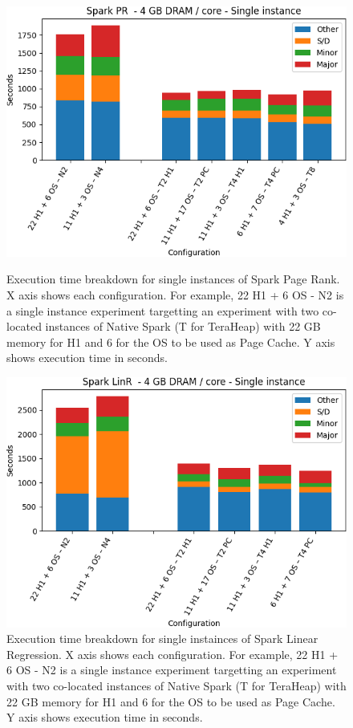 \begin{figure}[thbp]
\centering
    \includegraphics[width=\linewidth]{./fig/pr64_single.png}
    \caption{Execution time breakdown for single instances of Spark
    Page Rank. X axis shows each configuration.
        For example, 22 H1 + 6 OS - N2 is a single instance experiment targetting an experiment with two co-located instances of Native Spark (T for TeraHeap) with 22 GB memory for H1 and 6 for the OS to be used as Page Cache. Y axis shows execution time in seconds.}
    \label{fig:pr64_single}
	\includegraphics[width=\linewidth]{./fig/linr64_single.png}
    \caption{Execution time breakdown for single instainces of Spark
    Linear Regression. X axis shows each configuration.
        For example, 22 H1 + 6 OS - N2 is a single instance experiment targetting an experiment with two co-located instances of Native Spark (T for TeraHeap) with 22 GB memory for H1 and 6 for the OS to be used as Page Cache. Y axis shows execution time in seconds.}
    \label{fig:linr64_single}
\end{figure}

